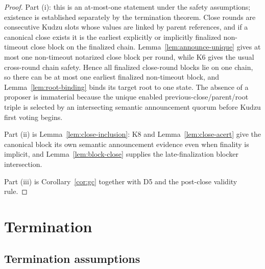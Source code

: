 \documentclass[11pt]{article}
\theoremstyle{definition}
\theoremstyle{remark}
\begin{document}
\begin{proof}
Part (i): this is an at-most-one statement under the safety assumptions; existence is established separately by the termination theorem. Close rounds are consecutive Kudzu slots whose values are linked by parent references, and if a canonical close exists it is the earliest explicitly or implicitly finalized non-timeout close block on the finalized chain. Lemma~\ref{lem:announce-unique} gives at most one non-timeout notarized close block per round, while K6 gives the usual cross-round chain safety. Hence all finalized close-round blocks lie on one chain, so there can be at most one earliest finalized non-timeout block, and Lemma~\ref{lem:root-binding} binds its target root to one state. The absence of a proposer is immaterial because the unique enabled previous-close/parent/root triple is selected by an intersecting semantic announcement quorum before Kudzu first voting begins.

Part (ii) is Lemma~\ref{lem:close-inclusion}: K8 and Lemma~\ref{lem:close-acert} give the canonical block its own semantic announcement evidence even when finality is implicit, and Lemma~\ref{lem:block-close} supplies the late-finalization blocker intersection.

Part (iii) is Corollary~\ref{cor:gc} together with D5 and the post-close validity rule.
\end{proof}

\section{Termination}

\subsection{Termination assumptions}
\end{document}
